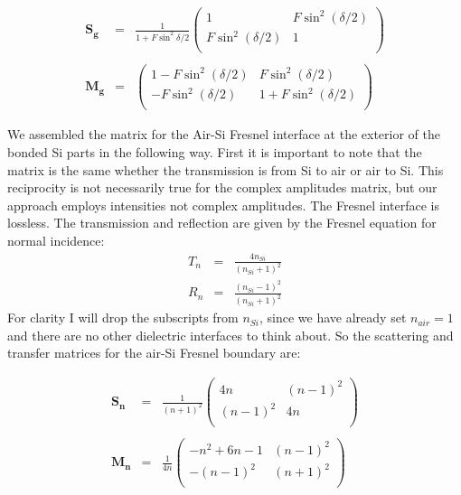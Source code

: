 \begin{eqnarray}
\boldsymbol{S_g}&=&\frac{1}{1+F\sin^2{\delta/2}} \left(
\begin{array}{cc}
1 & F \sin ^2(\delta/2) \\
F \sin ^2(\delta/2) & 1 \\
\end{array}
\right) \nonumber \\
\nonumber \\
\boldsymbol{M_g}&=&\left(
\begin{array}{cc}
 1-F \sin ^2(\delta/2) & F \sin ^2(\delta/2) \\
 -F \sin ^2(\delta/2) & 1+F \sin ^2(\delta/2) \\
\end{array}
\right)
\label{eqn:EtalonMatrix}
\end{eqnarray}

We assembled the matrix for the Air-Si Fresnel interface at the exterior of the bonded Si parts in the following way.  First it is important to note that the matrix is the same whether the transmission is from Si to air or air to Si.  This reciprocity is not necessarily true for the complex amplitudes matrix, but our approach employs intensities not complex amplitudes.  The Fresnel interface is lossless.  The transmission and reflection are given by the Fresnel equation for normal incidence:
\begin{eqnarray}
T_n&=&\frac{4n_{Si}}{(n_{Si}+1)^2} \\
R_n&=&\frac{(n_{Si}-1)^2}{(n_{Si}+1)^2} \label{eq:FresnelTrans}
\end{eqnarray}
For clarity I will drop the subscripts from $n_{Si}$, since we have already set $n_{air}=1$ and there are no other dielectric interfaces to think about.  So the scattering and transfer matrices for the air-Si Fresnel boundary are:

\begin{eqnarray}
\boldsymbol{S_n}&=&\frac{1}{(n+1)^2} \left(
\begin{array}{cc}
4n & (n-1)^2 \\
(n-1)^2 & 4n \\
\end{array}
\right)  \nonumber \\
\nonumber \\
\boldsymbol{M_n}&=&\frac{1}{4n}\left(
\begin{array}{cc}
 -n^2+6  n-1 & ( n-1)^2 \\
 -( n-1)^2 & ( n+1)^2 \\
\end{array}
\right)
\label{eqn:SiAirMatrix}
\end{eqnarray}

